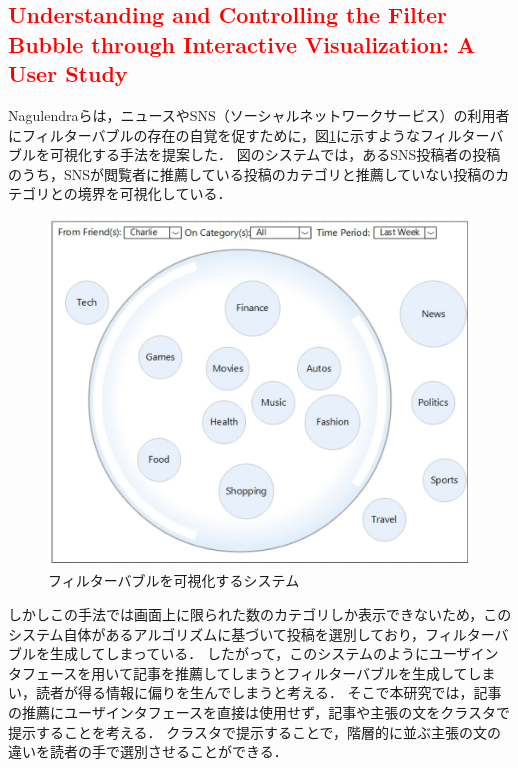 \documentclass[12pt,a4j]{jreport}
\begin{document}
\subsection{\textcolor{red}{Understanding and Controlling the Filter Bubble through Interactive Visualization: A User Study}}
Nagulendraらは，ニュースやSNS（ソーシャルネットワークサービス）の利用者にフィルターバブルの存在の自覚を促すために，図\ref{fig_bubble_ui}に示すようなフィルターバブルを可視化する手法を提案した\cite{nagulendra_understanding_2014}．
図のシステムでは，あるSNS投稿者の投稿のうち，SNSが閲覧者に推薦している投稿のカテゴリと推薦していない投稿のカテゴリとの境界を可視化している．

\begin{figure}[H]
	\centering
	\includegraphics[keepaspectratio, width=120mm]{img/bubble_ui.png}
	\caption{フィルターバブルを可視化するシステム\protect\footnotemark[13]}
	\label{fig_bubble_ui}
\end{figure}

しかしこの手法では画面上に限られた数のカテゴリしか表示できないため，このシステム自体があるアルゴリズムに基づいて投稿を選別しており，フィルターバブルを生成してしまっている．
したがって，このシステムのようにユーザインタフェースを用いて記事を推薦してしまうとフィルターバブルを生成してしまい，読者が得る情報に偏りを生んでしまうと考える．
そこで本研究では，記事の推薦にユーザインタフェースを直接は使用せず，記事や主張の文をクラスタで提示することを考える．
クラスタで提示することで，階層的に並ぶ主張の文の違いを読者の手で選別させることができる．
\end{document}
